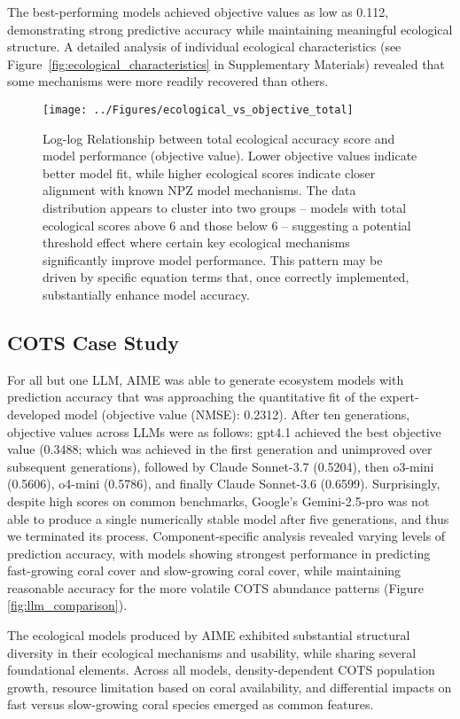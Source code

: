 The best-performing models achieved objective values as low as 0.112, demonstrating strong predictive accuracy while maintaining meaningful ecological structure. A detailed analysis of individual ecological characteristics (see Figure~\ref{fig:ecological_characteristics} in Supplementary Materials) revealed that some mechanisms were more readily recovered than others.

\begin{figure}[H]
\centering
\texttt{[image: ../Figures/ecological\_vs\_objective\_total]}
\caption{Log-log Relationship between total ecological accuracy score and model performance (objective value). Lower objective values indicate better model fit, while higher ecological scores indicate closer alignment with known NPZ model mechanisms. The data distribution appears to cluster into two groups -- models with total ecological scores above 6 and those below 6 -- suggesting a potential threshold effect where certain key ecological mechanisms significantly improve model performance. This pattern may be driven by specific equation terms that, once correctly implemented, substantially enhance model accuracy.}
\label{fig:ecological_total}
\end{figure}

\subsection{COTS Case Study}
\label{sec:cots_data}
For all but one LLM, AIME was able to generate ecosystem models with prediction accuracy that was approaching the quantitative fit of the expert-developed model (objective value (NMSE): 0.2312). After ten generations, objective values across LLMs were as follows: gpt4.1 achieved the best objective value (0.3488; which was achieved in the first generation and unimproved over subsequent generations), followed by Claude Sonnet-3.7 (0.5204), then o3-mini (0.5606), o4-mini (0.5786), and finally Claude Sonnet-3.6 (0.6599). Surprisingly, despite high scores on common benchmarks, Google's Gemini-2.5-pro was not able to produce a single numerically stable model after five generations, and thus we terminated its process. Component-specific analysis revealed varying levels of prediction accuracy, with models showing strongest performance in predicting fast-growing coral cover and slow-growing coral cover, while maintaining reasonable accuracy for the more volatile COTS abundance patterns (Figure \ref{fig:llm_comparison}).

The ecological models produced by AIME exhibited substantial structural diversity in their ecological mechanisms and usability, while sharing several foundational elements. Across all models, density-dependent COTS population growth, resource limitation based on coral availability, and differential impacts on fast versus slow-growing coral species emerged as common features.

